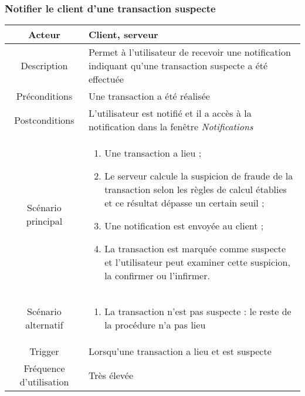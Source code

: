 \documentclass{article}
\begin{document}
\subsubsection{Notifier le client d'une transaction suspecte}
\begin{table}[h!]

\begin{tabular}{|c|p{11cm}|}
\hline
Acteur & Client, serveur \\
\hline
Description & Permet à l'utilisateur de recevoir une notification indiquant qu'une transaction suspecte a été effectuée \\
\hline
Préconditions & Une transaction a été réalisée \\
\hline
Postconditions & L'utilisateur est notifié et il a accès à la notification dans la fenêtre \emph{Notifications} \\
\hline
Scénario principal & \begin{enumerate}
\item Une transaction a lieu ;
\item Le serveur calcule la suspicion de fraude de la transaction selon les règles de calcul établies et ce résultat dépasse un certain seuil ;
\item Une notification est envoyée au client ;
\item La transaction est marquée comme suspecte et l'utilisateur peut examiner cette suspicion, la confirmer ou l'infirmer.
\end{enumerate} \\
\hline
Scénario alternatif & \begin{enumerate}
\item La transaction n'est pas suspecte : le reste de la procédure n'a pas lieu
\end{enumerate} \\
\hline
Trigger & Lorsqu'une transaction a lieu et est suspecte \\
\hline
Fréquence d'utilisation & Très élevée \\
\hline
\end{tabular}

\end{table}


\newpage
\end{document}

